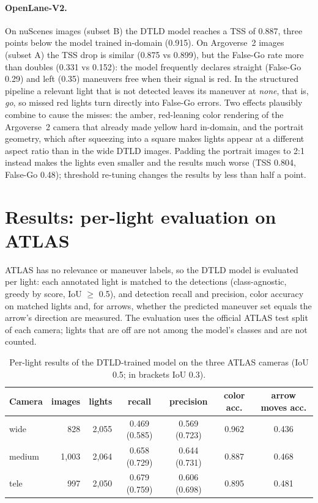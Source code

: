 \paragraph{OpenLane-V2.} On nuScenes images (subset B) the DTLD model reaches a TSS of 0.887, three points
below the model trained in-domain (0.915). On Argoverse~2 images (subset A) the TSS drop is similar
(0.875 vs 0.899), but the False-Go rate more than doubles (0.331 vs 0.152): the model frequently declares
straight (False-Go 0.29) and left (0.35) maneuvers free when their signal is red. In the structured
pipeline a relevant light that is not detected leaves its maneuver at \emph{none}, that is, \emph{go}, so
missed red lights turn directly into False-Go errors. Two effects plausibly combine to cause the misses: the amber, red-leaning color rendering of the Argoverse~2 camera that already made yellow
hard in-domain, and the portrait geometry, which after squeezing into a square makes lights appear at a
different aspect ratio than in the wide DTLD images. Padding the portrait images to 2:1 instead makes
the lights even smaller and the results much worse (TSS 0.804, False-Go 0.48); threshold re-tuning
changes the results by less than half a point.

\section{Results: per-light evaluation on ATLAS}
\label{sec:res-atlas}

ATLAS has no relevance or maneuver labels, so the DTLD model is evaluated per light: each annotated light
is matched to the detections (class-agnostic, greedy by score, IoU $\ge$ 0.5), and detection recall and
precision, color accuracy on matched lights and, for arrows, whether the predicted maneuver set equals
the arrow's direction are measured. The evaluation uses the official ATLAS test
split of each camera; lights that are off are not among the model's classes and are not counted.

\begin{table}[t]
\centering
\caption{Per-light results of the DTLD-trained model on the three ATLAS cameras (IoU 0.5; in brackets
IoU 0.3).}
\label{tab:atlas}
\small
\begin{tabular}{@{}lrrcccc@{}}
\toprule
Camera & images & lights & recall & precision & color acc. & arrow moves acc. \\
\midrule
wide & 828 & 2,055 & 0.469 (0.585) & 0.569 (0.723) & 0.962 & 0.436 \\
medium & 1,003 & 2,064 & 0.658 (0.729) & 0.644 (0.731) & 0.887 & 0.468 \\
tele & 997 & 2,050 & 0.679 (0.759) & 0.606 (0.698) & 0.895 & 0.481 \\
\bottomrule
\end{tabular}
\end{table}

